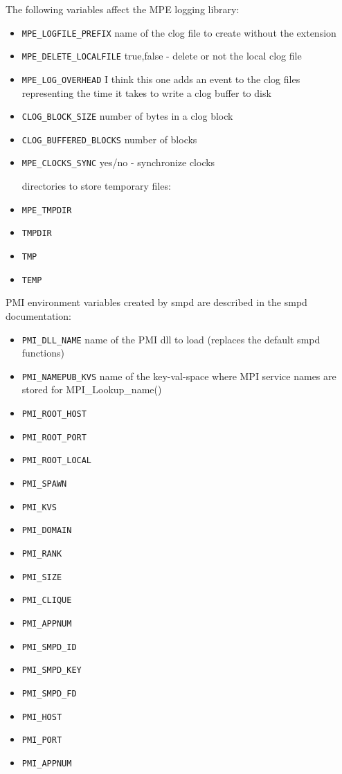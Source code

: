 \documentclass[dvipdfm,11pt]{article}
\begin{document}
The following variables affect the MPE logging library:
\begin{itemize}
\item \texttt{MPE\_LOGFILE\_PREFIX}
name of the clog file to create without the extension
\item \texttt{MPE\_DELETE\_LOCALFILE}
true,false - delete or not the local clog file
\item \texttt{MPE\_LOG\_OVERHEAD}
I think this one adds an event to the clog files representing the time it takes to write a clog buffer to disk
\item \texttt{CLOG\_BLOCK\_SIZE}
number of bytes in a clog block
\item \texttt{CLOG\_BUFFERED\_BLOCKS}
number of blocks
\item \texttt{MPE\_CLOCKS\_SYNC}
yes/no - synchronize clocks

directories to store temporary files:
\item \texttt{MPE\_TMPDIR}
\item \texttt{TMPDIR}
\item \texttt{TMP}
\item \texttt{TEMP}
\end{itemize}

PMI environment variables created by smpd are described in the smpd documentation:
\begin{itemize}
\item \texttt{PMI\_DLL\_NAME}
name of the PMI dll to load (replaces the default smpd functions)
\item \texttt{PMI\_NAMEPUB\_KVS}
name of the key-val-space where MPI service names are stored for MPI\_Lookup\_name()
\item \texttt{PMI\_ROOT\_HOST}
\item \texttt{PMI\_ROOT\_PORT}
\item \texttt{PMI\_ROOT\_LOCAL}
\item \texttt{PMI\_SPAWN}
\item \texttt{PMI\_KVS}
\item \texttt{PMI\_DOMAIN}
\item \texttt{PMI\_RANK}
\item \texttt{PMI\_SIZE}
\item \texttt{PMI\_CLIQUE}
\item \texttt{PMI\_APPNUM}
\item \texttt{PMI\_SMPD\_ID}
\item \texttt{PMI\_SMPD\_KEY}
\item \texttt{PMI\_SMPD\_FD}
\item \texttt{PMI\_HOST}
\item \texttt{PMI\_PORT}
\item \texttt{PMI\_APPNUM}
\end{itemize}
\end{document}
